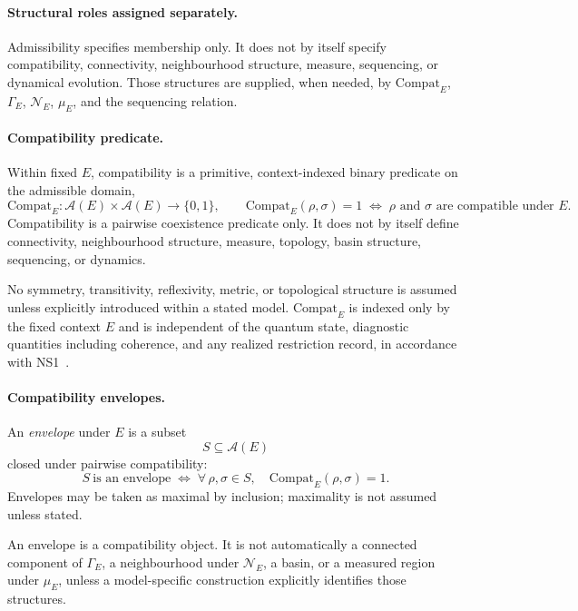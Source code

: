 \documentclass[aps,prx,onecolumn,11pt]{revtex4-2}
\theoremstyle{plain}
\theoremstyle{definition}
\theoremstyle{remark}
\begin{document}
\paragraph{Structural roles assigned separately.}
Admissibility specifies membership only. It does not by itself specify
compatibility, connectivity, neighbourhood structure, measure,
sequencing, or dynamical evolution. Those structures are supplied, when
needed, by \(\mathrm{Compat}_E\), \(\Gamma_E\), \(\mathcal N_E\),
\(\mu_E\), and the sequencing relation.

\paragraph{Compatibility predicate.}
Within fixed \(E\), compatibility is a primitive, context-indexed
binary predicate on the admissible domain,
\begin{equation}
\mathrm{Compat}_E :
\mathcal A(E)\times \mathcal A(E)
\to
\{0,1\},
\qquad
\mathrm{Compat}_E(\rho,\sigma)=1
\;\Longleftrightarrow\;
\text{\(\rho\) and \(\sigma\) are compatible under \(E\).}
\label{eq:compat_def}
\end{equation}
Compatibility is a pairwise coexistence predicate only. It does not by
itself define connectivity, neighbourhood structure, measure, topology,
basin structure, sequencing, or dynamics.

No symmetry, transitivity, reflexivity, metric, or topological
structure is assumed unless explicitly introduced within a stated
model. \(\mathrm{Compat}_E\) is indexed only by the fixed context \(E\)
and is independent of the quantum state, diagnostic quantities
including coherence, and any realized restriction record, in accordance
with NS1~\cite{Kraus1983,NielsenChuang2010,Watrous2018,Gisin1989,Gisin1990,
Polchinski1991}.

\paragraph{Compatibility envelopes.}
An \emph{envelope} under \(E\) is a subset
\[
S\subseteq \mathcal A(E)
\]
closed under pairwise compatibility:
\begin{equation}
S\ \text{is an envelope}
\;\Longleftrightarrow\;
\forall\,\rho,\sigma\in S,\quad
\mathrm{Compat}_E(\rho,\sigma)=1.
\label{eq:envelope_def}
\end{equation}
Envelopes may be taken as maximal by inclusion; maximality is not
assumed unless stated.

An envelope is a compatibility object. It is not automatically a
connected component of \(\Gamma_E\), a neighbourhood under
\(\mathcal N_E\), a basin, or a measured region under \(\mu_E\), unless
a model-specific construction explicitly identifies those structures.
\end{document}
